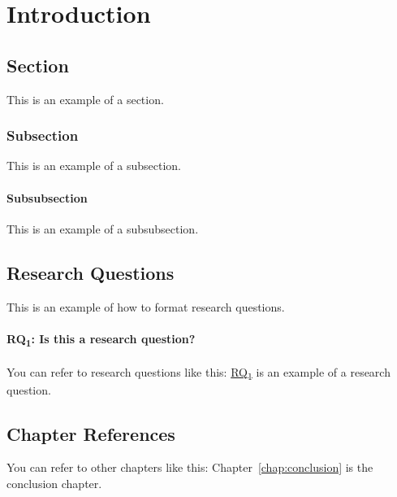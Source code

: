 \chapter{Introduction}
\label{chap:introduction}

\section{Section}

This is an example of a section.

\subsection{Subsection}

This is an example of a subsection.

\subsubsection{Subsubsection}

This is an example of a subsubsection.

\section{Research Questions}

This is an example of how to format research questions.

\hypertarget{rq:1}{
    \subsubsection{RQ\textsubscript{1}: Is this a research question?}
}

You can refer to research questions like this: \hyperlink{rq:1}{RQ\textsubscript{1}} is an example of a research question.

\section{Chapter References}

You can refer to other chapters like this: Chapter~\ref{chap:conclusion} is the conclusion chapter.
